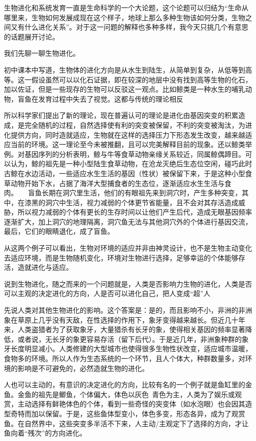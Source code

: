 \documentclass[UTF8]{ctexart}
\begin{document}
\newpage
生物进化和系统发育一直是生命科学的一个大论题，这个论题可以归结为“生命从哪里来，生物如何发展成现在这个样子，地球上那么多种生物该如何分类，生物之间又有什么进化关系”。对于这一问题的解释也多种多样，我今天只挑几个有意思的话题展开讨论。\par
我们先聊一聊生物进化。\par 初中课本中写道，生物体的进化方向是从水生到陆生，从简单到复杂，从低等到高等。这一假设虽然可以以化石证据，即在较深的地层中没有找到高等生物的化石，加以佐证，但是一些现存的生物可以反驳这一观点。比如鲸类是一种水生的哺乳动物，盲鱼在发育过程中失去了视觉。这都与传统的理论相反\par 所以科学家们提出了新的理论，现在普遍认可的理论是进化由基因突变的积累造成，是完全随机的过程，自然选择使有利的突变被保留，不利的突变被淘汰，为进化提供方向，同时造就适应，生物就在这样的选择压力下形态发生改变，越来越适应当前的环境。这一理论至今未被推翻，且可以完美解释目前的现象。还以鲸类举例。对基因序列的分析表明，鲸与牛等食草动物亲缘关系较近，同属鲸偶蹄目。可以认为，鲸的祖先是一种小型陆生食草动物，在沧龙灭绝后生态位空闲，碰巧此时古鲸在水边活动，一些适应水生生活的基因（性状）被保留下来，于是这种小型食草动物开始下水，占据了海洋大型捕食者的生态位，逐渐适应水生生活与食肉。\ \ \ 盲鱼长期在洞穴里生活，他们的有眼祖先来到洞穴时，产生多种突变，其中，在漆黑的洞穴中生活，视力减弱的个体更节省能量，且不会对其存活造成威胁，所以视力减弱的个体有更长的生存时间以让他们产生后代，造成无眼基因频率逐渐扩大，加上洞穴的地理隔离，洞穴鱼无法与其他洞穴外的个体进行基因交流，最后，它们的眼睛退化，成了盲鱼。\par
从这两个例子可以看出，生物对环境的适应并非由神灵设计，也不是生物主动变化去适应环境，而是生物随机变化，环境对生物进行选择，足够幸运的个体能够存活，造就进化与适应。\par
说到生物进化，随之而来的一个问题就是，人类是否影响力生物的进化，人类是否可以主观的决定进化的方向，人是否可以进化自己，把人变成“超”人\par
先说人类对其他生物进化的影响。这个答案是：是的，而且影响不小，非洲的非洲象在草原上几乎没有天敌，在性选择的作用下，象牙变得越来越长。但近几十年来，人类盗猎者为了获取象牙，大量猎杀有长牙的象，使得相关基因的频率显著降低，或者说，无长牙的象更容易存活（留下后代）。于是近几年，非洲象种群的象牙长度明显减小。人类修建的大型城市也使得很多生物性状改变，适应城市温暖，食物多的环境。所以人作为生态系统的一个环节，且人个体大，种群数量多，对环境的影响是不可避免的，必然造就生物的进化。\par
人也可以主动的，有意识的决定进化的方向，比较有名的一个例子就是鱼缸里的金鱼。金鱼的祖先是鲫鱼，个体偏大，体色以灰色\ 青色为主，人类为了娱乐或观赏，主动选择有鲜艳体色的个体，看到一些奇怪的突变体（如水泡眼）也会因其造型奇特而加以保留。于是，这些鱼体型变小，体色多变，形态各异，成为了观赏鱼。在自然界中，这些突变多半活不下来，人主动/主观定下了选择的方向，才让鱼向着“残次”的方向进化。\par
\end{document}
